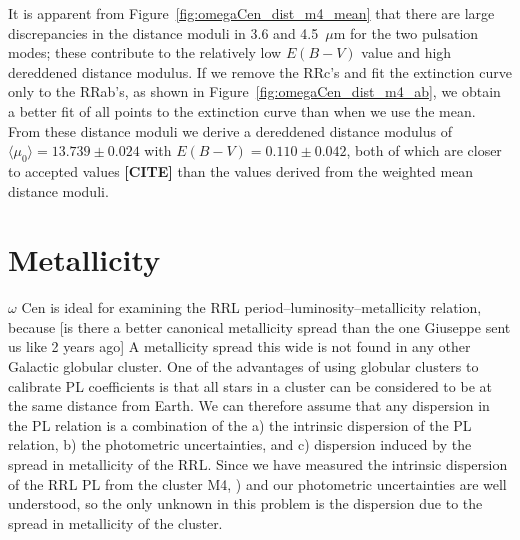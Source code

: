 \documentclass[a4paper,fleqn,usenatbib]{mnras}
\begin{document}
It is apparent from Figure~\ref{fig:omegaCen_dist_m4_mean} that there are large discrepancies in the distance moduli in 3.6 and 4.5~$\mu$m for the two pulsation modes; these contribute to the relatively low $E(B-V)$ value and high dereddened distance modulus.
If we remove the RRc's and fit the extinction curve only to the RRab's, as shown in Figure~\ref{fig:omegaCen_dist_m4_ab}, we obtain a better fit of all points to the extinction curve than when we use the mean. From these distance moduli we derive a dereddened distance modulus of $\langle \mu_0 \rangle = 13.739 \pm 0.024$ with $E(B-V) = 0.110 \pm 0.042$, both of which are closer to accepted values {\bf [CITE]} than the values derived from the weighted mean distance moduli.

\section{Metallicity}
\label{sec:metallicity}

$\omega$ Cen is ideal for examining the RRL period--luminosity--metallicity relation, because [is there a better canonical metallicity spread than the one Giuseppe sent us like 2 years ago]
A metallicity spread this wide is not found in any other Galactic globular cluster. One of the advantages of using globular clusters to calibrate PL coefficients is that all stars in a cluster can be considered to be at the same distance from Earth. We can therefore assume that any dispersion in the PL relation is a combination of the a) the intrinsic dispersion of the PL relation, b) the photometric uncertainties, and c) dispersion induced by the spread in metallicity of the RRL. Since we have measured the intrinsic dispersion of the RRL PL from the cluster M4, \citet{2015arXiv150507858N}) and our photometric uncertainties are well understood, so the only unknown in this problem is the dispersion due to the spread in metallicity of the cluster. 
\end{document}
